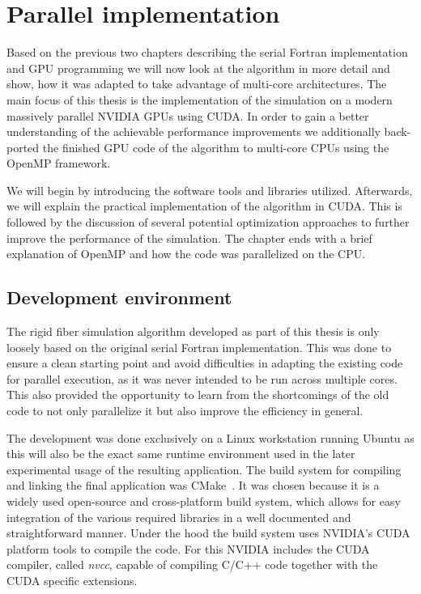 \chapter{Parallel implementation}
\label{cha:parallel_implementation}

Based on the previous two chapters describing the serial Fortran implementation and GPU programming we will now look at the algorithm in more detail and show, how it was adapted to take advantage of multi-core architectures. The main focus of this thesis is the implementation of the simulation on a modern massively parallel NVIDIA GPUs using CUDA. In order to gain a better understanding of the achievable performance improvements we additionally back-ported the finished GPU code of the algorithm to multi-core CPUs using the OpenMP framework.

We will begin by introducing the software tools and libraries utilized. Afterwards, we will explain the practical implementation of the algorithm in CUDA. This is followed by the discussion of several potential optimization approaches to further improve the performance of the simulation. The chapter ends with a brief explanation of OpenMP and how the code was parallelized on the CPU.

\section{Development environment}
The rigid fiber simulation algorithm developed as part of this thesis is only loosely based on the original serial Fortran implementation. This was done to ensure a clean starting point and avoid difficulties in adapting the existing code for parallel execution, as it was never intended to be run across multiple cores. This also provided the opportunity to learn from the shortcomings of the old code to not only parallelize it but also improve the efficiency in general.

The development was done exclusively on a Linux workstation running Ubuntu as this will also be the exact same runtime environment used in the later experimental usage of the resulting application. The build system for compiling and linking the final application was CMake~\cite{CMake}. It was chosen because it is a widely used open-source and cross-platform build system, which allows for easy integration of the various required libraries in a well documented and straightforward manner. Under the hood the build system uses NVIDIA's CUDA platform tools to compile the code. For this NVIDIA includes the CUDA compiler, called \emph{nvcc}, capable of compiling C/C++ code together with the CUDA specific extensions.

